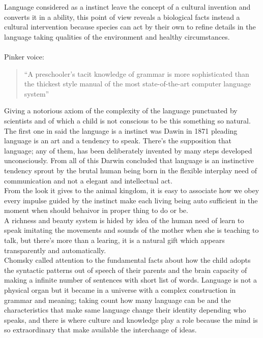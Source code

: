 \documentclass[13pt,letterpaper,onecolumn]{report}
\begin{document}
\hspace{1em}Language considered as a instinct leave the concept of a cultural invention and converts it in a ability, this point of view reveals a biological facts instead a cultural intervention because species can act by their own to refine details in the language taking qualities of the environment and healthy circumstances.\\
\\Pinker voice:
\begin{verse}
“A preschooler's tacit knowledge of grammar is more sophisticated than the thickest style manual of the most state-of-the-art computer language system”
\end{verse}
Giving a notorious axiom of the complexity of the language punctuated by scientists and of which a child is not conscious to be this something so natural.\\

\hspace{1em}The first one in said the language is a instinct was Dawin in 1871 pleading language is an art and a tendency to speak. There’s the supposition that language; any of them, has been deliberately invented by many steps developed unconsciously. From all of this Darwin concluded that language is an instinctive tendency sprout by the brutal human being born in the flexible interplay need of communication and not a elegant and intellectual act.\\

\hspace{1em}From the look it gives to the animal kingdom, it is easy to associate how we obey every impulse guided by the instinct make each living being auto sufficient in the moment when should behaivor in proper thing to do or be.\\

\hspace{1em}A richness and beauty system is hided by idea of the human need of learn to speak imitating the movements and sounds of the mother when she is teaching to talk, but there’s more than a learing, it is a natural gift which appears transparently  and automatically.\\

\hspace{1em} Chomsky called attention to the fundamental facts about how the child adopts the syntactic patterns out of speech of their parents and the brain capacity of making a infinite number of sentences with short list of words. Language is not a physical organ but it became in a universe with a complex construction in grammar and meaning; taking count how many language can be and the characteristics that make same language change their identity depending who speaks, and there is where culture and knowledge play a role because the mind is so extraordinary that make available the interchange of ideas.\\
\end{document}

